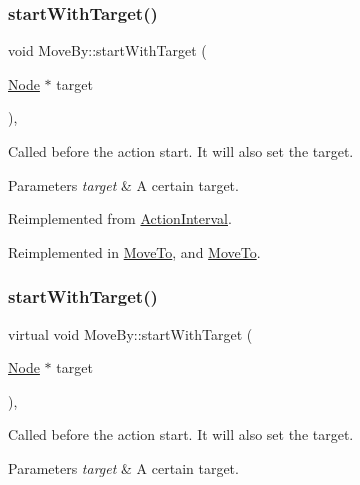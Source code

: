 \subsubsection{\texorpdfstring{start\+With\+Target()}{startWithTarget()}\hspace{0.1cm}{\footnotesize\ttfamily [1/2]}}
{\footnotesize\ttfamily void Move\+By\+::start\+With\+Target (\begin{DoxyParamCaption}\item[{\hyperlink{classNode}{Node} $\ast$}]{target }\end{DoxyParamCaption})\hspace{0.3cm}{\ttfamily [override]}, {\ttfamily [virtual]}}

Called before the action start. It will also set the target.


\begin{DoxyParams}{Parameters}
{\em target} & A certain target. \\
\hline
\end{DoxyParams}


Reimplemented from \hyperlink{classActionInterval_ad3d91186b2c3108488ddbbdbbd982484}{Action\+Interval}.



Reimplemented in \hyperlink{classMoveTo_a434fce91e656b8f239cef63938fb29a6}{Move\+To}, and \hyperlink{classMoveTo_af9f86e7c5d391fe494cf6a597b839b13}{Move\+To}.

\mbox{\label{classMoveBy_a1eb16a340ada5b0256772c6ca3a97bea}} 
\subsubsection{\texorpdfstring{start\+With\+Target()}{startWithTarget()}\hspace{0.1cm}{\footnotesize\ttfamily [2/2]}}
{\footnotesize\ttfamily virtual void Move\+By\+::start\+With\+Target (\begin{DoxyParamCaption}\item[{\hyperlink{classNode}{Node} $\ast$}]{target }\end{DoxyParamCaption})\hspace{0.3cm}{\ttfamily [override]}, {\ttfamily [virtual]}}

Called before the action start. It will also set the target.


\begin{DoxyParams}{Parameters}
{\em target} & A certain target. \\
\hline
\end{DoxyParams}


